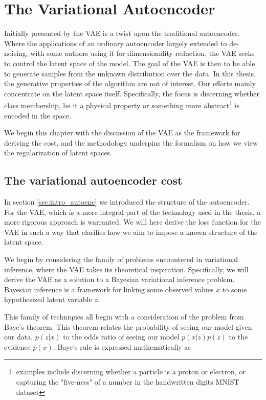 \section{The Variational Autoencoder}\label{sec:vae}

Initially presented by \citet{Kingma2013} the VAE is a twist upon the traditional autoencoder. Where the applications of an ordinary autoencoder largely extended to de-noising, with some authors using it for dimensionality reduction, the VAE seeks to control the latent space of the model. The goal of the VAE is then to be able to generate samples from the unknown distribution over the data. In this thesis, the generative properties of the algorithm are not of interest. Our efforts mainly concentrate on the latent space itself. Specifically, the focus is discerning whether class membership, be it a physical property or something more abstract\footnote{examples include discerning whether a particle is a proton or electron, or capturing the "five-ness" of a number in the handwritten digits MNIST dataset} is encoded in the space.

We begin this chapter with the discussion of the VAE as the framework for deriving the cost, and the methodology underpins the formalism on how we view the regularization of latent spaces.

\subsection{The variational autoencoder cost}

In section \ref{sec:intro_autoenc} we introduced the structure of the autoencoder. For the VAE, which is a more integral part of the technology used in the thesis, a more rigorous approach is warranted. We will here derive the loss function for the VAE in such a way that clarifies how we aim to impose a known structure of the latent space.

We begin by considering the family of problems encountered in variational inference, where the VAE takes its theoretical inspiration. Specifically, we will derive the VAE  as a solution to a Bayesian variational inference problem. Bayesian inference is a framework for linking some observed values $x$ to some hypothesized latent variable $z$. 

This family of techniques all begin with a consideration of the problem from Baye's theorem. This theorem relates the probability of seeing our model given our data, $p(z|x)$ to the odds ratio of seeing our model $p(x|z)p(z)$ to the evidence $p(x)$. Baye's rule is expressed mathematically as 

